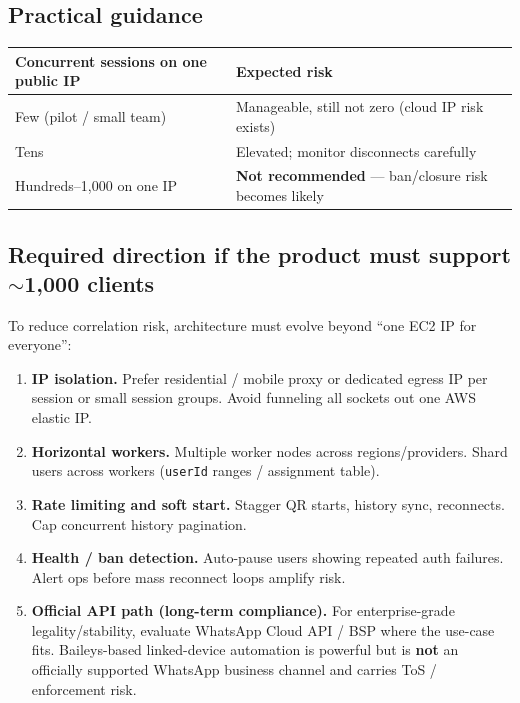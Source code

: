 \documentclass[11pt,a4paper]{article}
\begin{document}
\subsection{Practical guidance}

\begin{tabularx}{\textwidth}{L{6.2cm} X}
\toprule
\textbf{Concurrent sessions on one public IP} & \textbf{Expected risk} \\
\midrule
Few (pilot / small team) & Manageable, still not zero (cloud IP risk exists) \\
Tens & Elevated; monitor disconnects carefully \\
Hundreds--1{,}000 on one IP & \textbf{Not recommended} --- ban/closure risk becomes likely \\
\bottomrule
\end{tabularx}

\subsection{Required direction if the product must support $\sim$1{,}000 clients}

To reduce correlation risk, architecture must evolve beyond ``one EC2 IP for everyone'':

\begin{enumerate}[leftmargin=1.4em]
  \item \textbf{IP isolation.} Prefer residential / mobile proxy or dedicated egress IP per session or small session groups. Avoid funneling all sockets out one AWS elastic IP.
  \item \textbf{Horizontal workers.} Multiple worker nodes across regions/providers. Shard users across workers (\texttt{userId} ranges / assignment table).
  \item \textbf{Rate limiting and soft start.} Stagger QR starts, history sync, reconnects. Cap concurrent history pagination.
  \item \textbf{Health / ban detection.} Auto-pause users showing repeated auth failures. Alert ops before mass reconnect loops amplify risk.
  \item \textbf{Official API path (long-term compliance).} For enterprise-grade legality/stability, evaluate WhatsApp Cloud API / BSP where the use-case fits. Baileys-based linked-device automation is powerful but is \textbf{not} an officially supported WhatsApp business channel and carries ToS / enforcement risk.
\end{enumerate}
\end{document}
